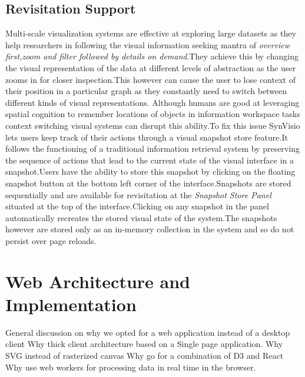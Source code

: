 \subsection{Revisitation Support}
Multi-scale visualization systems are effective at exploring large datasets as they help researchers in following the visual information seeking mantra of \textit{overview first,zoom and filter followed by details on demand}\cite{Shneiderman96theeyes}.They achieve this by changing the visual representation of the data at different levels of abstraction as the user zooms in for closer inspection\cite{Stolte}.This however can cause the user to lose context of their position in a particular graph as they constantly need to switch between different kinds of visual representations.
Although humans are good at leveraging spatial cognition to remember locations of objects in information workspace tasks\cite{datamountain} context switching visual systems can disrupt this ability.To fix this issue SynVisio lets users keep track of their actions through a visual snapshot store feature.It follows the functioning of a traditional information retrieval system by preserving the sequence of actions that lead to the current state of the visual interface in a snapshot.Users have the ability to store this snapshot by clicking on the floating snapshot button at the bottom left corner of the interface.Snapshots are stored sequentially and are available for revisitation at the \textit{Snapshot Store Panel} situated at the top of the interface.Clicking on any snapshot in the panel automatically recreates the stored visual state of the system.The snapshots however are stored only as an in-memory collection in the system and so do not persist over page reloads.


\section{Web Architecture and Implementation}
General discussion on why we opted for a web application instead of a desktop client
Why thick client architecture based on a Single page application.
Why SVG instead of rasterized canvas
Why go for a combination of D3 and React
Why use web workers for processing data in real time in the browser.

